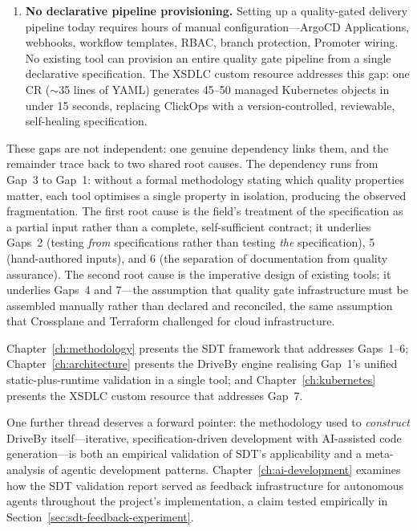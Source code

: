 \begin{enumerate}
  \item \textbf{No declarative pipeline provisioning.} Setting up a quality-gated delivery pipeline today requires hours of manual configuration---ArgoCD Applications, webhooks, workflow templates, RBAC, branch protection, Promoter wiring. No existing tool can provision an entire quality gate pipeline from a single declarative specification. The XSDLC custom resource addresses this gap: one CR (\(\sim\)35 lines of YAML) generates 45--50 managed Kubernetes objects in under 15 seconds, replacing ClickOps with a version-controlled, reviewable, self-healing specification.
\end{enumerate}

These gaps are not independent: one genuine dependency links them, and the remainder trace back to two shared root causes. The dependency runs from Gap~3 to Gap~1: without a formal methodology stating which quality properties matter, each tool optimises a single property in isolation, producing the observed fragmentation. The first root cause is the field's treatment of the specification as a partial input rather than a complete, self-sufficient contract; it underlies Gaps~2 (testing \textit{from} specifications rather than testing \textit{the} specification), 5 (hand-authored inputs), and 6 (the separation of documentation from quality assurance). The second root cause is the imperative design of existing tools; it underlies Gaps~4 and 7---the assumption that quality gate infrastructure must be assembled manually rather than declared and reconciled, the same assumption that Crossplane and Terraform challenged for cloud infrastructure.

Chapter~\ref{ch:methodology} presents the SDT framework that addresses Gaps~1--6; Chapter~\ref{ch:architecture} presents the DriveBy engine realising Gap~1's unified static-plus-runtime validation in a single tool; and Chapter~\ref{ch:kubernetes} presents the XSDLC custom resource that addresses Gap~7.

One further thread deserves a forward pointer: the methodology used to \textit{construct} DriveBy itself---iterative, specification-driven development with AI-assisted code generation---is both an empirical validation of SDT's applicability and a meta-analysis of agentic development patterns. Chapter~\ref{ch:ai-development} examines how the SDT validation report served as feedback infrastructure for autonomous agents throughout the project's implementation, a claim tested empirically in Section~\ref{sec:sdt-feedback-experiment}.
